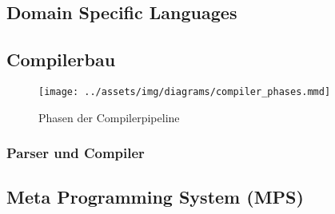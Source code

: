 \lipsum[5]

\subsection{Domain Specific Languages}\label{subsec:domain-specific-languages}
\lipsum[5]

\subsection{Compilerbau}\label{subsec:compilerbau}
\begin{wrapfigure}{rH}{0.5\textwidth}
    \begin{center}
        \texttt{[image: ../assets/img/diagrams/compiler\_phases.mmd]}
    \end{center}
    \caption{Phasen der Compilerpipeline~\autocite{aho-2006}}
    \label{fig:cpmpiler-phases}
\end{wrapfigure}
\lipsum[5]

\subsubsection{Parser und Compiler}
\lipsum[5]

\subsection{Meta Programming System (MPS)}\label{subsec:meta-programming-system-(mps)}
\lipsum[5]

